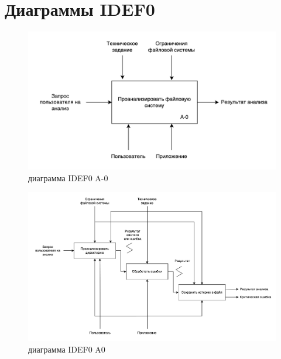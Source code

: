 \section{Диаграммы IDEF0}
\begin{figure}[ht] 
	\center
	\includegraphics [scale=0.2] {my_folder/images/IDEF.png}
	\caption{диаграмма IDEF0 A-0} 
	\label{fig:idef0-A-0-a}  
\end{figure}
\begin{figure}[ht] 
	\center
	\includegraphics [scale=0.15] {my_folder/images/IDEF0_A0.png}
	\caption{диаграмма IDEF0 A0} 
	\label{fig:idef0-A0-a}  
\end{figure}



